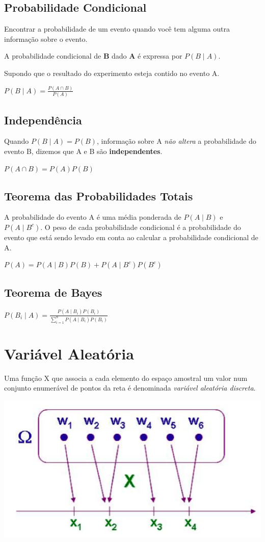 \documentclass[a4paper, 12pt]{article}
\begin{document}
\subsection{Probabilidade Condicional}
	Encontrar a probabilidade de um evento quando você tem alguma outra informação sobre o evento.
	
	A probabilidade condicional de \textbf{B} dado \textbf{A} é expressa por $P(B\mid A)$.
	
	Supondo que o resultado do experimento esteja contido no evento A.
	
	\begin{center}
		\LARGE
		$P(B\mid A) = \frac{P(A\cap B)}{P(A)}$
	\end{center}	
	
\subsection{Independência}
	Quando $P(B\mid A) = P(B)$, informação sobre A \textit{não altera} a probabilidade do evento B, dizemos que A e B são \textbf{independentes}.
	\begin{center}
		\LARGE
		$P(A\cap B) = P(A)P(B)$
	\end{center}

\subsection{Teorema das Probabilidades Totais}
	A probabilidade do evento A é uma média ponderada de $P(A\mid B)$ e $P(A\mid B^{c})$. O peso de cada probabilidade condicional é a probabilidade do evento que está sendo levado em conta ao calcular a probabilidade condicional de A.
	\begin{center}
		\LARGE
		$P(A) = P(A\mid B)P(B) + P(A\mid B^{c})P(B^{c})$
	\end{center}

\subsection{Teorema de Bayes}
	\begin{center}
		\LARGE
		$P(B_{i}\mid A) = 
		\frac{P(A\mid B_{i})P(B_{i}) }{\sum_{i = 1}^{n} P(A\mid B_{i})P(B_{i})}
		$
	\end{center}

\section{Variável Aleatória}
	Uma função X que associa a cada elemento do espaço amostral um valor num conjunto enumerável de pontos da reta é denominada \textit{variável aleatória discreta}.
	\begin{center}
		\includegraphics[width=0.5\linewidth]{imagens/vardis}
	\end{center}
	
\end{document}

